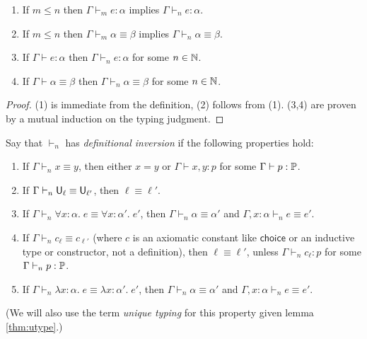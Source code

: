 \begin{lemma}
\begin{enumerate}
\item If $m\le n$ then $\Gamma\vdash_m e:\alpha$ implies $\Gamma\vdash_n e:\alpha$.
\item If $m\le n$ then $\Gamma\vdash_m\alpha\equiv\beta$ implies $\Gamma\vdash_n \alpha\equiv\beta$.
\item If $\Gamma\vdash e:\alpha$ then $\Gamma\vdash_n e:\alpha$ for some $n\in\mathbb{N}$.
\item If $\Gamma\vdash\alpha\equiv\beta$ then $\Gamma\vdash_n \alpha\equiv\beta$ for some $n\in\mathbb{N}$.
\end{enumerate}
\end{lemma}
\begin{proof}
(1) is immediate from the definition, (2) follows from (1). (3,4) are proven by a mutual induction on the typing judgment.
\end{proof}
\begin{definition}
Say that $\vdash_n$ has \emph{definitional inversion} if the following properties hold:
\begin{enumerate}
\item If $\Gamma\vdash_n x\equiv y$, then either $x=y$ or $\Gamma\vdash x,y:p$ for some $\Gamma\vdash p:\P$.
\item If $\Gamma\vdash_n \U_\ell\equiv\U_{\ell'}$, then $\ell\equiv\ell'$.
\item If $\Gamma\vdash_n \forall x:\alpha.\;e\equiv\forall x:\alpha'.\;e'$, then $\Gamma\vdash_n \alpha\equiv\alpha'$ and $\Gamma,x:\alpha\vdash_n e\equiv e'$.
\item If $\Gamma\vdash_n c_{\ell}\equiv c_{\ell'}$ (where $c$ is an axiomatic constant like $\mathsf{choice}$ or an inductive type or constructor, not a definition), then $\ell\equiv\ell'$, unless $\Gamma\vdash_n c_{\ell}:p$ for some $\Gamma\vdash_n p:\P$.
\item If $\Gamma\vdash_n \lambda x:\alpha.\;e\equiv\lambda x:\alpha'.\;e'$, then $\Gamma\vdash_n \alpha\equiv\alpha'$ and $\Gamma,x:\alpha\vdash_n e\equiv e'$.
\end{enumerate}
(We will also use the term \emph{unique typing} for this property given lemma \ref{thm:utype}.)
\end{definition}

